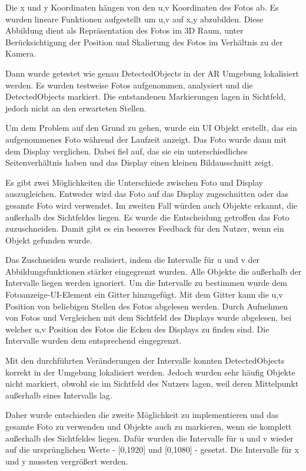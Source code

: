 Die x und y Koordinaten hängen von den u,v Koordinaten des Fotos ab. Es wurden lineare Funktionen aufgestellt um u,v auf x,y abzubilden. Diese Abbildung dient als Repräsentation des Fotos im 3D Raum, unter Berücksichtigung der Position und Skalierung des Fotos im Verhältnis zu der Kamera.

Dann wurde getestet wie genau DetectedObjects in der AR Umgebung lokalisiert werden. Es wurden testweise Fotos aufgenommen, analysiert und die DetectedObjects markiert. Die entstandenen Markierungen lagen in Sichtfeld, jedoch nicht an den erwarteten Stellen. 

Um dem Problem auf den Grund zu gehen, wurde ein UI Objekt erstellt, das ein aufgenommenes Foto während der Laufzeit anzeigt.
Das Foto wurde dann mit dem Display verglichen. Dabei fiel auf, das sie ein unterschiedliches Seitenverhältnis haben und das Display einen kleinen Bildausschnitt zeigt.  

Es gibt zwei Möglichkeiten die Unterschiede zwischen Foto und Display auszugleichen. Entweder wird das Foto auf das Display zugeschnitten oder das gesamte Foto wird verwendet. Im zweiten Fall würden auch Objekte erkannt, die außerhalb des Sichtfeldes liegen.
Es wurde die Entscheidung getroffen das Foto zuzuschneiden. Damit gibt es ein besseres Feedback für den Nutzer, wenn ein Objekt gefunden wurde. 

Das Zuschneiden wurde realisiert, indem die Intervalle für u und v der Abbildungsfunktionen stärker eingegrenzt wurden. Alle Objekte die außerhalb der Intervalle liegen werden ignoriert. Um die Intervalle zu bestimmen wurde dem Fotoanzeige-UI-Element ein Gitter hinzugefügt. Mit dem Gitter kann die u,v Position von beliebigen Stellen des Fotos abgelesen werden. 
Durch Aufnehmen von Fotos und Vergleichen mit dem Sichtfeld des Displays wurde abgelesen, bei welcher u,v Position des Fotos die Ecken des Displays zu finden sind. Die Intervalle wurden dem entsprechend eingegrenzt. 

Mit den durchführten Veränderungen der Intervalle konnten DetectedObjects korrekt in der Umgebung lokalisiert werden. Jedoch wurden sehr häufig Objekte nicht markiert, obwohl sie im Sichtfeld des Nutzers lagen, weil deren Mittelpunkt außerhalb eines Intervalls lag.

Daher wurde entschieden die zweite Möglichkeit zu implementieren und das gesamte Foto zu verwenden und Objekte auch zu markieren, wenn sie komplett außerhalb des Sichtfeldes liegen. 
Dafür wurden die Intervalle für u und v wieder auf die ursprünglichen Werte - [0,1920] und [0,1080] - gesetzt. Die Intervalle für x und y mussten vergrößert werden.

